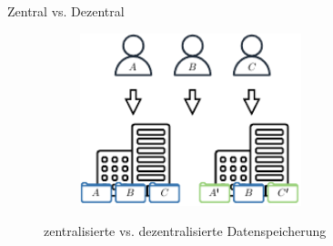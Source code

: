 \begin{frame}[c]{Zentral vs. Dezentral}
    \vspace{1.5em}

    \begin{figure}
        \centering
        \begin{subfigure}{0.4\textwidth}
            \centering
            \includegraphics[height=5cm]{./assets/central.drawio.pdf}
        \end{subfigure}
        \hspace{2cm}

        \caption{zentralisierte vs. dezentralisierte Datenspeicherung}
    \end{figure}
\end{frame}


